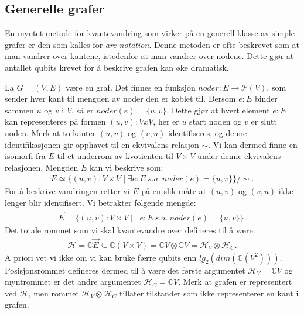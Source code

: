 
    \subsection*{Generelle grafer}

        En myntet metode for kvantevandring som virker på en generell klasse av simple grafer er den som kalles for \emph{arc notation}. Denne metoden er ofte beskrevet som at man vandrer over kantene, istedenfor at man vandrer over nodene. Dette gjør at antallet qubits krevet for å beskrive grafen kan øke dramatisk.

        La $G=(V,E)$ være en graf. Det finnes en funksjon $noder:E\rightarrow\mathcal{P}(V)$, som sender hver kant til mengden av noder den er koblet til. Dersom $e:E$ binder sammen $u$ og $v$ i $V$, så er $noder(e)=\{u,v\}$. Dette gjør at hvert element $e:E$ kan representeres på formen $(u,v):VxV$, her er $u$ start noden og $v$ er slutt noden. Merk at to kanter $(u,v)$ og $(v,u)$ identifiseres, og denne identifikasjonen gir opphavet til en ekvivalens relasjon $\sim$. Vi kan dermed finne en isomorfi fra $E$ til et underrom av kvotienten til $V\times V$ under denne ekvivalens relasjonen. Mengden $E$ kan vi beskrive som:
        \begin{align*}
            E \simeq \{(u,v):V\times V\mid \exists e:E\ s.a.\ noder(e)=\{u,v\}\}/\sim.
        \end{align*}
        For å beskrive vandringen retter vi $E$ på en slik måte at $(u,v)$ og $(v,u)$ ikke lenger blir identifisert. Vi betrakter følgende mengde:
        \begin{align*}
            \vec{E} = \{(u,v):V\times V\mid \exists e:E\ s.a.\ noder(e)=\{u,v\}\}.
        \end{align*}
        Det totale rommet som vi skal kvantevandre over defineres til å være:
        \begin{align*}
            \mathcal{H} = \mathbb{C}\vec{E} \subseteq \mathbb{C}(V\times V)=\mathbb{C}V\otimes\mathbb{C}V=\mathcal{H}_V\otimes\mathcal{H}_C.
        \end{align*}
        A priori vet vi ikke om vi kan bruke færre qubits enn $lg_2(dim(\mathbb{C}(V^2)))$. Posisjonsrommet defineres dermed til å være det første argumentet $\mathcal{H}_V=\mathbb{C}V$ og myntrommet er det andre argumentet $\mathcal{H}_C=\mathbb{C}V$. Merk at grafen er representert ved $\mathcal{H}$, men rommet $\mathcal{H}_V\otimes\mathcal{H}_C$ tillater tilstander som ikke representerer en kant i grafen.

